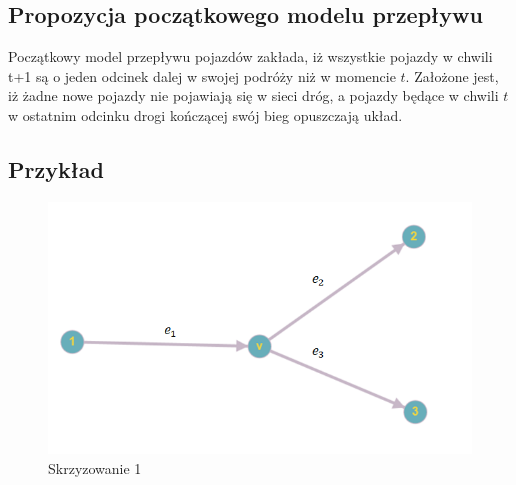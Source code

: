 \documentclass[12pt]{book}
\theoremstyle{plain}
\begin{document}
\subsection{Propozycja początkowego modelu przepływu}
Początkowy model przepływu pojazdów zakłada, iż wszystkie pojazdy w chwili t+1 są o jeden odcinek dalej w swojej podróży niż w momencie $t$. Założone jest, iż żadne nowe pojazdy nie pojawiają się w sieci dróg, a pojazdy będące w chwili $t$ w ostatnim odcinku drogi kończącej swój bieg opuszczają układ.
\subsection{Przykład}
\begin{figure}[H]
	\centering
	\includegraphics[width=14cm]{skrz_1}
	\caption{Skrzyzowanie 1}
	\label{fig:skrz_1}
\end{figure}
\end{document}
